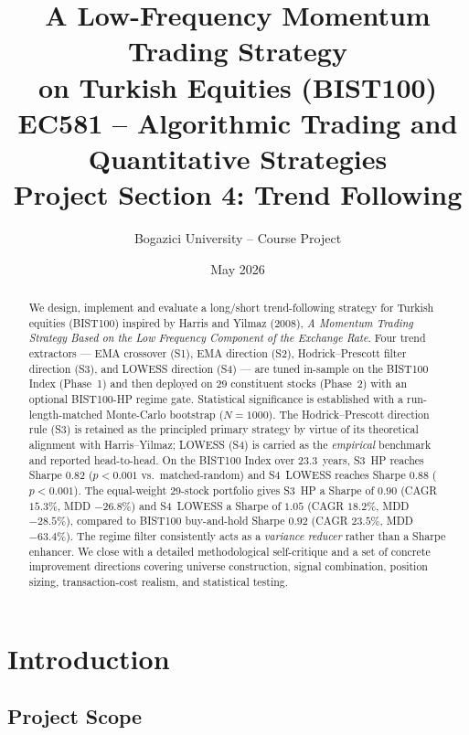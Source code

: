 \documentclass[11pt,a4paper]{article}
\title{\textbf{A Low-Frequency Momentum Trading Strategy \\
\large on Turkish Equities (BIST100)} \\[0.5em]
\large EC581 -- Algorithmic Trading and Quantitative Strategies \\[0.2em]
\normalsize Project Section 4: Trend Following}
\author[]{Bogazici University -- Course Project}
\affil[]{Instructor: Dr.~Ayhan Y\"uksel}
\date{May 2026}
\begin{document}

\maketitle
\thispagestyle{empty}

\begin{abstract}
\noindent We design, implement and evaluate a long/short trend-following strategy for
Turkish equities (BIST100) inspired by Harris and Yilmaz (2008), \emph{A Momentum
Trading Strategy Based on the Low Frequency Component of the Exchange Rate}.
Four trend extractors --- EMA crossover (S1), EMA direction (S2), Hodrick--Prescott
filter direction (S3), and LOWESS direction (S4) --- are tuned in-sample on the
BIST100 Index (Phase~1) and then deployed on 29 constituent stocks (Phase~2) with
an optional BIST100-HP regime gate. Statistical significance is established with a
run-length-matched Monte-Carlo bootstrap ($N{=}1000$). The Hodrick--Prescott
direction rule (S3) is retained as the principled primary strategy by virtue of its
theoretical alignment with Harris--Yilmaz; LOWESS (S4) is carried as the
\emph{empirical} benchmark and reported head-to-head.
On the BIST100 Index over 23.3~years, S3~HP reaches Sharpe $0.82$ ($p<0.001$
vs.~matched-random) and S4~LOWESS reaches Sharpe $0.88$ ($p<0.001$). The
equal-weight 29-stock portfolio gives S3~HP a Sharpe of $0.90$ (CAGR $15.3\%$,
MDD $-26.8\%$) and S4~LOWESS a Sharpe of $1.05$ (CAGR $18.2\%$, MDD $-28.5\%$),
compared to BIST100 buy-and-hold Sharpe $0.92$ (CAGR $23.5\%$, MDD $-63.4\%$).
The regime filter consistently acts as a \emph{variance reducer} rather than a
Sharpe enhancer. We close with a detailed methodological self-critique and a
set of concrete improvement directions covering universe construction, signal
combination, position sizing, transaction-cost realism, and statistical testing.
\end{abstract}

\tableofcontents
\newpage

\section{Introduction}

\subsection{Project Scope}
\end{document}
